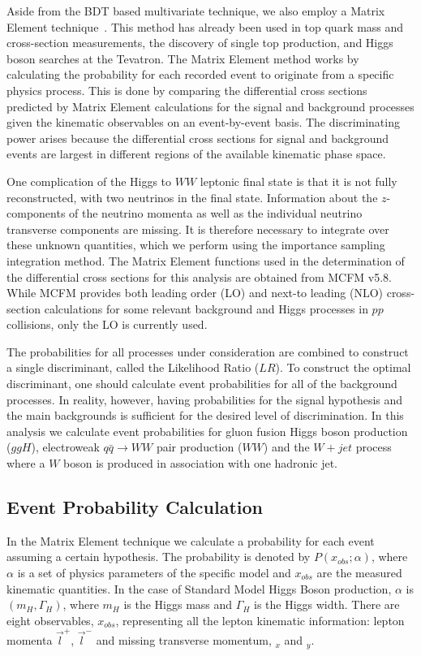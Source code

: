 Aside from the BDT based multivariate technique, we also employ a Matrix Element technique~\cite{MENote}. 
This method has already been used in top quark mass and cross-section 
measurements, the discovery of single top production, and Higgs boson searches at the Tevatron.  
The Matrix Element method works by calculating the probability for each recorded
event to originate from a specific physics process.
This is done by comparing the differential cross sections predicted by Matrix Element 
calculations for the signal and background processes given the kinematic observables
on an event-by-event basis.
The discriminating power arises because the differential cross sections for 
signal and background events are largest in different regions of the available
kinematic phase space. 

One complication of the Higgs to $WW$ leptonic final state is that it is not fully 
reconstructed, with two neutrinos in the final state. 
Information about the $z$-components of the neutrino momenta as well as the individual 
neutrino transverse components are missing. It is therefore necessary to integrate 
over these unknown quantities, which we perform using the importance sampling 
integration method.
The Matrix Element functions used in the determination of the differential cross sections
for this analysis are obtained from  MCFM v5.8.  While MCFM 
provides both leading order (LO) and next-to leading (NLO) cross-section calculations for 
some relevant background and Higgs processes in $pp$ collisions, only the
LO is currently used.

The probabilities for all processes under consideration are combined 
to construct a single discriminant, called the Likelihood Ratio ($LR$).  
To construct the optimal discriminant, one should calculate 
event probabilities for all of the background processes. In reality, however, having 
probabilities for the signal hypothesis and the main backgrounds is sufficient for the 
desired level of discrimination. In this analysis we calculate event probabilities 
for gluon fusion Higgs boson production ($ggH$), electroweak $q\bar{q}\rightarrow WW$ pair 
production ($WW$) and the $W+jet$ process where a $W$ boson is produced in association with one hadronic jet. 


\subsection{Event Probability Calculation}

In the Matrix Element technique we calculate a probability  for each event assuming a
certain hypothesis.  The probability is denoted by $P(x_{obs};\alpha)$,
where $\alpha$ is a set of physics 
parameters of the specific model and $x_{obs}$ are the measured kinematic quantities.
In the case of Standard Model Higgs Boson production,
 $\alpha$ is $(m_H, \Gamma_H)$, where  $m_H$ is the Higgs mass 
and $\Gamma_H$ is the Higgs width. There are eight observables, $x_{obs}$, representing all the 
lepton kinematic information: lepton momenta $\vec{l}^+$, $\vec{l}^-$ and missing 
transverse momentum, \met$_x$ and \met$_y$.

